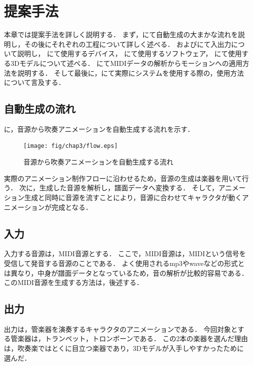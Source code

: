 \chapter{提案手法} \label{chap:algorithm}
本章では提案手法を詳しく説明する．
まず，にて自動生成の大まかな流れを説明し，その後にそれぞれの工程について詳しく述べる．
およびにて入出力について説明し，
にて使用するデバイス，
にて使用するソフトウェア，
にて使用する3Dモデルについて述べる．
にてMIDIデータの解析からモーションへの適用方法を説明する．
そして最後に，にて実際にシステムを使用する際の，使用方法について言及する．

\section{自動生成の流れ} \label{sec:flow}
に，音源から吹奏アニメーションを自動生成する流れを示す．\\
\begin{figure}[h]
	\centering
	\texttt{[image: fig/chap3/flow.eps]}
	\caption{音源から吹奏アニメーションを自動生成する流れ}
	\label{fig:flow}
\end{figure}
\indent
実際のアニメーション制作フローに沿わせるため，音源の生成は楽器を用いて行う．
次に，生成した音源を解析し，譜面データへ変換する．
そして，アニメーション生成と同時に音源を流すことにより，音源に合わせてキャラクタが動くアニメーションが完成となる．

\section{入力} \label{sec:input}
入力する音源は，MIDI音源とする．
ここで，MIDI音源は，MIDIという信号を受信して発音する音源のことである．
よく使用されるmp3やwaveなどの形式とは異なり，中身が譜面データとなっているため，音の解析が比較的容易である．\\
\indent
このMIDI音源を生成する方法は，後述する．

\section{出力} \label{sec:output}
出力は，管楽器を演奏するキャラクタのアニメーションである．
今回対象とする管楽器は，トランペット，トロンボーンである．
この2本の楽器を選んだ理由は，吹奏楽ではとくに目立つ楽器であり，3Dモデルが入手しやすかったために選んだ．

